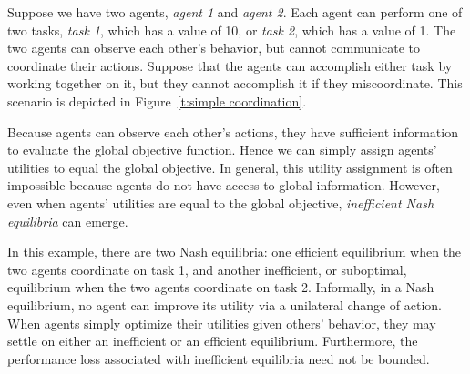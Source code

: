 \begin{example}\label{e:interdependent utilities}
Suppose we have two agents, {\it agent 1} and {\it agent 2}. Each agent can perform one of two tasks, {\it task 1}, which has a value of 10, or {\it task 2}, which has a value of 1.  The two agents can observe each other's behavior, but cannot communicate to coordinate their actions. Suppose that the agents can accomplish either task by working together on it, but they cannot accomplish it if they miscoordinate. This scenario is depicted in Figure~\ref{t:simple coordination}.

Because agents can observe each other's actions, they have sufficient information to evaluate the global objective function. Hence we can simply assign agents' utilities to equal the global objective. In general, this utility assignment is often impossible because agents do not have access to global information. However, even when agents' utilities are equal to the global objective, {\it inefficient Nash equilibria} can emerge.

In this example, there are two Nash equilibria: one efficient equilibrium when the two agents coordinate on task 1, and another inefficient, or suboptimal, equilibrium when the two agents coordinate on task 2. Informally, in a Nash equilibrium, no agent can improve its utility via a unilateral change of action. When agents simply optimize their utilities given others' behavior, they may settle on either an inefficient or an efficient equilibrium. Furthermore, the performance loss associated with inefficient equilibria need not be bounded.




\end{example}
